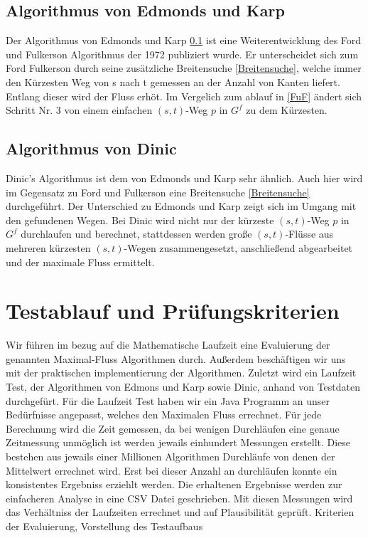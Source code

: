 \documentclass[a4paper]{llncs}
\begin{document}
\subsection{Algorithmus von Edmonds und Karp}
\label{EuK}
Der Algorithmus von Edmonds und Karp \ref{EuK} ist eine Weiterentwicklung des Ford und Fulkerson Algorithmus der 1972 publiziert wurde.
Er unterscheidet sich zum Ford Fulkerson durch seine zusätzliche Breitensuche \ref{Breitensuche},
welche immer den Kürzesten Weg von s nach t gemessen an der Anzahl von Kanten liefert. 
Entlang dieser wird der Fluss erhöt.
Im Vergelich zum ablauf in \ref{FuF} ändert sich Schritt Nr. 3 von einem einfachen $(s, t)$-Weg $p$ in $G^{f}$ zu dem Kürzesten.

\subsection{Algorithmus von Dinic}
\label{Dinic}
Dinic's Algorithmus ist dem von Edmonds und Karp sehr ähnlich. Auch hier wird im Gegensatz zu Ford und Fulkerson eine Breitensuche \ref{Breitensuche} durchgeführt. Der Unterschied zu Edmonds und Karp zeigt sich im Umgang mit den gefundenen Wegen. Bei Dinic wird nicht nur der kürzeste $(s, t)$-Weg $p$ in $G^{f}$ durchlaufen und berechnet, stattdessen werden große $(s, t)$-Flüsse aus mehreren kürzesten $(s, t)$-Wegen zusammengesetzt, anschließend abgearbeitet und der maximale Fluss ermittelt.

\section{Testablauf und Prüfungskriterien}
\label{Inhalt}
Wir führen im bezug auf die Mathematische Laufzeit eine Evaluierung der genannten Maximal-Fluss Algorithmen durch. Außerdem beschäftigen wir uns mit der praktischen implementierung der Algorithmen. Zuletzt wird ein Laufzeit Test, der Algorithmen von Edmons und Karp sowie Dinic, anhand von Testdaten durchgefürt.
Für die Laufzeit Test haben wir ein Java Programm an unser Bedürfnisse angepasst, welches den Maximalen Fluss errechnet. 
Für jede Berechnung wird die Zeit gemessen, da bei wenigen Durchläufen eine genaue Zeitmessung unmöglich ist werden jewails einhundert Messungen erstellt. Diese bestehen aus jewails einer Millionen Algorithmen Durchläufe von denen der Mittelwert errechnet wird.
Erst bei dieser Anzahl an durchläufen konnte ein konsistentes Ergebniss erziehlt werden.
Die erhaltenen Ergebnisse werden zur einfacheren Analyse in eine CSV Datei geschrieben.
Mit diesen Messungen wird das Verhältniss der Laufzeiten errechnet und auf Plausibilität geprüft.
Kriterien der Evaluierung, Vorstellung des Testaufbaus
\end{document}
